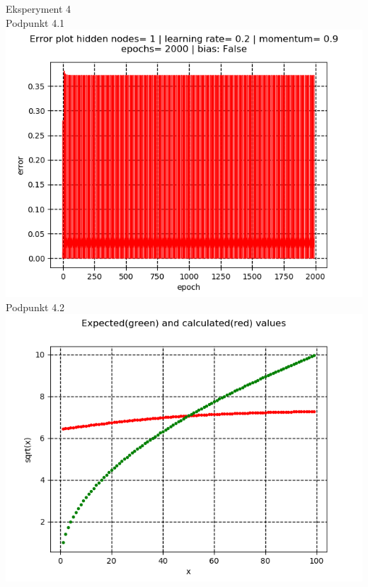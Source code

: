 \documentclass{classrep}
\begin{document}
{Eksperyment 4\\
Podpunkt 4.1\\
\includegraphics[scale=0.8]{imgs/4_1.png}\\
Podpunkt 4.2\\
\includegraphics[scale=0.8]{imgs/4_2.png}\\
}
\end{document}
